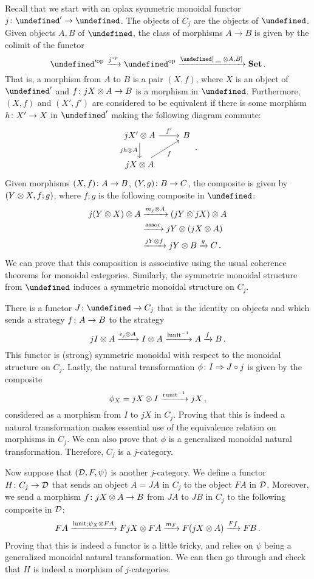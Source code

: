 \documentclass[sigplan,10pt,review]{acmart}\settopmatter{printfolios=true,printccs=false,printacmref=false}
\let\C\undefined
\begin{document}
Recall that we start with an oplax symmetric monoidal functor $j\from \C'\to\C$.  
The objects of $C_j$ are the objects of $\C$.  
Given objects $A,B$ of $\C$, the class of morphisms $A\to B$ is given by the colimit of the functor
\[
  \oppcat{\C'} \xrightarrow{\oppcat{j}}
  \oppcat{\C} \xrightarrow{\C[\blank\tensor A,B]}
  \Set\,.
  \]
That is, a morphism from $A$ to $B$ is a pair $(X,f)$, where $X$ is an object of $\C'$ and $f\colon jX \otimes A \to B$ is a morphism in $\C$.  
Furthermore, $(X, f)$ and $(X', f')$ are considered to be equivalent if there is some morphism $h\colon X'\to X$ in $\C'$ making the following diagram commute:
\[
  \begin{tikzcd}
    j X' \tensor A \arrow[r, "f'"] \arrow[d, "j h \tensor A"']
      & B \\
    j X \tensor A \arrow[ur, "f"']
      &
  \end{tikzcd}\,.
  \]
Given morphisms $(X,f)\colon A \to B$, $(Y,g)\colon B \to C$, the composite is given by $(Y\otimes X,f;g)$, where $f;g$ is the following composite in $\C$:
\begin{align*}
  j(Y\otimes X)\otimes A & \xrightarrow{m_j\otimes A}
    (jY \otimes jX) \otimes A \\ & \xrightarrow{\operatorname{assoc}}
      jY \otimes (jX \otimes A) \\ & \xrightarrow{jY \otimes f}
        jY \otimes B \xrightarrow{g}
          C\,.
\end{align*}
We can prove that this composition is associative using the usual coherence theorems for monoidal categories.  
Similarly, the symmetric monoidal structure from $\C$ induces a symmetric monoidal structure on $C_j$.  

There is a functor $J\from \C\to C_j$ that is the identity on objects and which sends a strategy $f\colon A \to B$ to the strategy
\[
  j I \otimes A \xrightarrow{\epsilon_j\otimes A}
  I \otimes A \xrightarrow{\operatorname{lunit}^{-1}}
  A \xrightarrow{f} B\,.
  \]
This functor is (strong) symmetric monoidal with respect to the monoidal structure on $C_j$.  
Lastly, the natural transformation $\phi\colon I \Rightarrow J\circ j$ is given by the composite
\[
  \phi_X = jX \otimes I \xrightarrow{\operatorname{runit}^{-1}}
  jX\,,
  \]
considered as a morphism from $I$ to $jX$ in $C_j$.  
Proving that this is indeed a natural transformation makes essential use of the equivalence relation on morphisms in $C_j$.  
We can also prove that $\phi$ is a generalized monoidal natural transformation.  
Therefore, $C_j$ is a $j$-category.

Now suppose that $({\mathcal{D}},F,\psi)$ is another $j$-category.  
We define a functor $H\colon C_j\to{\mathcal{D}}$ that sends an object $A=JA$ in $C_j$ to the object $FA$ in ${\mathcal{D}}$.  
Moreover, we send a morphism $f\colon jX\otimes A \to B$ from $JA$ to $JB$ in $C_j$ to the following composite in ${\mathcal{D}}$:
\begin{align*}
  FA \xrightarrow{\operatorname{lunit};\psi_X\otimes FA}
  FjX \otimes FA \xrightarrow{m_F}
  F (jX \otimes A) \xrightarrow{F f}
  F B\,.
\end{align*}
Proving that this is indeed a functor is a little tricky, and relies on $\psi$ being a generalized monoidal natural transformation.  
We can then go through and check that $H$ is indeed a morphism of $j$-categories.
\end{document}

